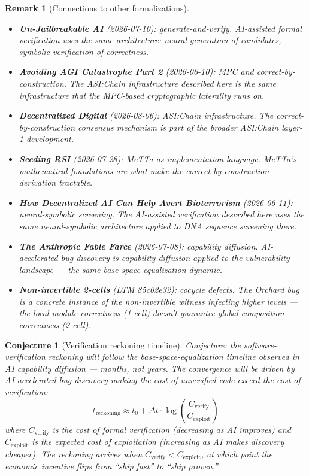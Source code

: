 \documentclass[11pt,a4paper]{article}
\newtheorem{remark}[definition]{Remark}
\newtheorem{conjecture}[definition]{Conjecture}
\begin{document}
\begin{remark}[Connections to other formalizations]
\begin{itemize}
\item \textbf{Un-Jailbreakable AI} (2026-07-10): generate-and-verify.
  AI-assisted formal verification uses the same architecture:
  neural generation of candidates, symbolic verification of
  correctness.
\item \textbf{Avoiding AGI Catastrophe Part 2} (2026-06-10): MPC and
  correct-by-construction. The ASI:Chain infrastructure described
  here is the same infrastructure that the MPC-based cryptographic
  laterality runs on.
\item \textbf{Decentralized Digital} (2026-08-06): ASI:Chain
  infrastructure. The correct-by-construction consensus mechanism
  is part of the broader ASI:Chain layer-1 development.
\item \textbf{Seeding RSI} (2026-07-28): MeTTa as implementation
  language. MeTTa's mathematical foundations are what make the
  correct-by-construction derivation tractable.
\item \textbf{How Decentralized AI Can Help Avert Bioterrorism}
  (2026-06-11): neural-symbolic screening. The AI-assisted
  verification described here uses the same neural-symbolic
  architecture applied to DNA sequence screening there.
\item \textbf{The Anthropic Fable Farce} (2026-07-08): capability
  diffusion. AI-accelerated bug discovery is capability diffusion
  applied to the vulnerability landscape --- the same base-space
  equalization dynamic.
\item \textbf{Non-invertible 2-cells} (LTM 85c02e32): cocycle defects.
  The Orchard bug is a concrete instance of the non-invertible
  witness infecting higher levels --- the local module correctness
  (1-cell) doesn't guarantee global composition correctness (2-cell).
\end{itemize}
\end{remark}

\begin{conjecture}[Verification reckoning timeline]
Conjecture: the software-verification reckoning will follow the
base-space-equalization timeline observed in AI capability
diffusion --- months, not years. The convergence will be driven
by AI-accelerated bug discovery making the cost of unverified
code exceed the cost of verification:
\[
  t_{\text{reckoning}} \approx t_0 + \Delta t \cdot
  \log\left(\frac{C_{\text{verify}}}{C_{\text{exploit}}}\right)
\]
where $C_{\text{verify}}$ is the cost of formal verification (decreasing
as AI improves) and $C_{\text{exploit}}$ is the expected cost of
exploitation (increasing as AI makes discovery cheaper). The reckoning
arrives when $C_{\text{verify}} < C_{\text{exploit}}$, at which point
the economic incentive flips from ``ship fast'' to ``ship proven.''
\end{conjecture}
\end{document}
